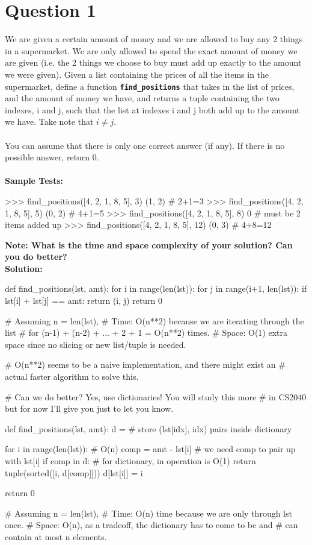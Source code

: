 \section{Question 1}
We are given a certain amount of money and we are allowed to buy any 2 things in a
supermarket. We are only allowed to spend the exact amount of money we are given
(i.e. the 2 things we choose to buy must add up exactly to the amount we were given).
Given a list containing the prices of all the items in the supermarket, define a function
\texttt{\bfseries find\_positions} that takes in the list of prices, and the amount of money we have,
and returns a tuple containing the two indexes, i and j, such that the list at indexes i and
j both add up to the amount we have. Take note that $i \neq j$. \\ \\
You can assume that there is only one correct answer (if any). If there is no possible
answer, return 0. \\ \\
\textbf{Sample Tests:}
\begin{python}
>>> find_positions([4, 2, 1, 8, 5], 3)
(1, 2)  # 2+1=3
>>> find_positions([4, 2, 1, 8, 5], 5)
(0, 2)  # 4+1=5
>>> find_positions([4, 2, 1, 8, 5], 8)
0       # must be 2 items added up
>>> find_positions([4, 2, 1, 8, 5], 12)
(0, 3)  # 4+8=12
\end{python}
\textbf{Note: What is the time and space complexity of your solution? Can you do better?} \\
\textbf{Solution:}
\begin{python}
def find_positions(lst, amt):
    for i in range(len(lst)):
        for j in range(i+1, len(lst)):
            if lst[i] + lst[j] == amt:
                return (i, j)
    return 0

# Assuming n = len(lst),
# Time: O(n**2) because we are iterating through the list
# for (n-1) + (n-2) + ... + 2 + 1 = O(n**2) times.
# Space: O(1) extra space since no slicing or new list/tuple is needed.

# O(n**2) seems to be a naive implementation, and there might exist an
# actual faster algorithm to solve this.


# Can we do better? Yes, use dictionaries! You will study this more
# in CS2040 but for now I'll give you just to let you know.

def find_positions(lst, amt):
    d = {} # store (lst[idx], idx) pairs inside dictionary

    for i in range(len(lst)): # O(n)
        comp = amt - lst[i] # we need comp to pair up with lst[i]
        if comp in d: # for dictionary, in operation is O(1)
            return tuple(sorted([i, d[comp]]))
        d[lst[i]] = i
        
    return 0

# Assuming n = len(lst),
# Time: O(n) time because we are only through lst once.
# Space: O(n), as a tradeoff, the dictionary has to come to be and
# can contain at most n elements.
\end{python}

